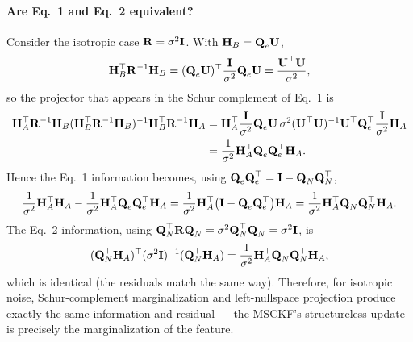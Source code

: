\paragraph{Are Eq.~1 and Eq.~2 equivalent?} Consider the isotropic case $\vect{R} = \sigma^2\vect{I}$. With $\vect{H}_B = \vect{Q}_e\vect{U}$,
\begin{align}
\vect{H}_B\trans\vect{R}^{-1}\vect{H}_B = (\vect{Q}_e\vect{U})\trans\frac{\vect{I}}{\sigma^2}\vect{Q}_e\vect{U} = \frac{\vect{U}\trans\vect{U}}{\sigma^2},
\end{align}
so the projector that appears in the Schur complement of Eq.~1 is
\begin{align}
\vect{H}_A\trans\vect{R}^{-1}\vect{H}_B(\vect{H}_B\trans\vect{R}^{-1}\vect{H}_B)^{-1}\vect{H}_B\trans\vect{R}^{-1}\vect{H}_A
&= \vect{H}_A\trans\frac{\vect{I}}{\sigma^2}\vect{Q}_e\vect{U}\,\sigma^2(\vect{U}\trans\vect{U})^{-1}\vect{U}\trans\vect{Q}_e\trans\frac{\vect{I}}{\sigma^2}\vect{H}_A \notag\\
&= \frac{1}{\sigma^2}\vect{H}_A\trans\vect{Q}_e\vect{Q}_e\trans\vect{H}_A.
\end{align}
Hence the Eq.~1 information becomes, using $\vect{Q}_e\vect{Q}_e\trans = \vect{I} - \vect{Q}_N\vect{Q}_N\trans$,
\begin{align}
\frac{1}{\sigma^2}\vect{H}_A\trans\vect{H}_A - \frac{1}{\sigma^2}\vect{H}_A\trans\vect{Q}_e\vect{Q}_e\trans\vect{H}_A
= \frac{1}{\sigma^2}\vect{H}_A\trans\big(\vect{I} - \vect{Q}_e\vect{Q}_e\trans\big)\vect{H}_A
= \frac{1}{\sigma^2}\vect{H}_A\trans\vect{Q}_N\vect{Q}_N\trans\vect{H}_A.
\end{align}
The Eq.~2 information, using $\vect{Q}_N\trans\vect{R}\vect{Q}_N = \sigma^2\vect{Q}_N\trans\vect{Q}_N = \sigma^2\vect{I}$, is
\begin{align}
(\vect{Q}_N\trans\vect{H}_A)\trans(\sigma^2\vect{I})^{-1}(\vect{Q}_N\trans\vect{H}_A) = \frac{1}{\sigma^2}\vect{H}_A\trans\vect{Q}_N\vect{Q}_N\trans\vect{H}_A,
\end{align}
which is identical (the residuals match the same way). Therefore, for isotropic noise, Schur-complement marginalization and left-nullspace projection produce exactly the same information and residual --- the MSCKF's structureless update is precisely the marginalization of the feature.
